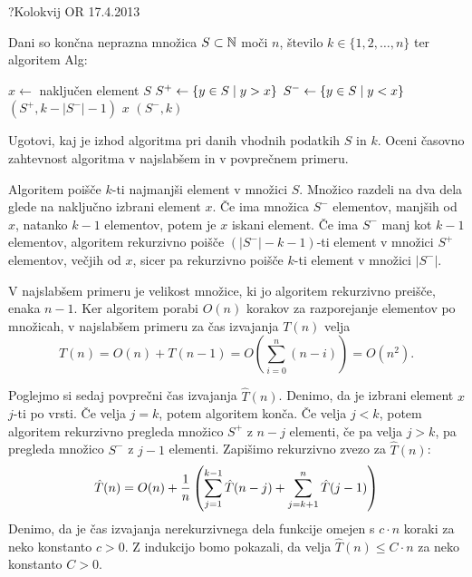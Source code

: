 \begin{naloga}{?}{Kolokvij OR 17.4.2013}
\begin{vprasanje}[alg]
Dani so končna neprazna množica $S \subset \mathbb{N}$ moči $n$,
število $k \in \{1, 2, \dots, n\}$ ter algoritem {\sc Alg}:
\begin{small}
\begin{algorithmic}
    \State $x \gets$ naključen element $S$
    \State $S^+ \gets \left\{ y \in S \; \middle| \; y > x \right\}$
    \State $S^- \gets \left\{ y \in S \; \middle| \; y < x \right\}$
        \State {}$(S^+, k - |S^-| - 1)$
        \State \Return $x$
    \Else
        \State {}$(S^-, k)$
    \EndIf
\EndFunction
\end{algorithmic}
\end{small}
Ugotovi, kaj je izhod algoritma pri danih vhodnih podatkih $S$ in $k$.
Oceni časovno zahtevnost algoritma v najslabšem in v povprečnem primeru.
\end{vprasanje}

\begin{odgovor}
Algoritem poišče $k$-ti najmanjši element v množici $S$.
Množico razdeli na dva dela glede na naključno izbrani element $x$.
Če ima množica $S^-$ elementov, manjših od $x$, natanko $k-1$ elementov,
potem je $x$ iskani element.
Če ima $S^-$ manj kot $k-1$ elementov,
algoritem rekurzivno poišče $(|S^-| - k - 1)$-ti element
v množici $S^+$ elementov, večjih od $x$,
sicer pa rekurzivno poišče $k$-ti element v množici $|S^-|$.

V najslabšem primeru je velikost množice,
ki jo algoritem rekurzivno preišče, enaka $n - 1$.
Ker algoritem porabi $O(n)$ korakov za razporejanje elementov po množicah,
v najslabšem primeru za čas izvajanja $T(n)$ velja
$$
T(n) = O(n) + T(n-1) = O\left(\sum_{i=0}^n (n-i)\right) = O(n^2).
$$

Poglejmo si sedaj povprečni čas izvajanja $\hat{T}(n)$.
Denimo, da je izbrani element $x$ $j$-ti po vrsti.
Če velja $j = k$, potem algoritem konča.
Če velja $j < k$, potem algoritem rekurzivno pregleda
množico $S^+$ z $n-j$ elementi,
če pa velja $j > k$, pa pregleda množico $S^-$ z $j-1$ elementi.
Zapišimo rekurzivno zvezo za $\hat{T}(n)$:
$$
\hat{T}(n) = O(n) +
{1 \over n} \left(\sum_{j=1}^{k-1} \hat{T}(n-j) +
\sum_{j=k+1}^n \hat{T}(j-1) \right)
$$
Denimo, da je čas izvajanja nerekurzivnega dela funkcije
omejen s $c \cdot n$ koraki za neko konstanto $c > 0$.
Z indukcijo bomo pokazali,
da velja $\hat{T}(n) \le C \cdot n$ za neko konstanto $C > 0$.


\end{odgovor}
\end{naloga}
